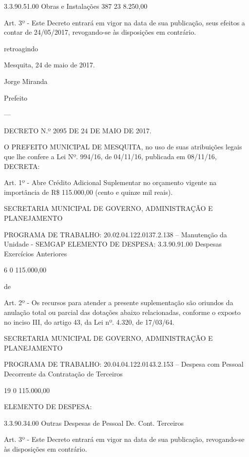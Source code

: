 \documentclass{doliberto}
\begin{document}
3.3.90.51.00  Obras e Instalações  387  23  8.250,00 

 
 

 
Art.  3º  -  Este  Decreto  entrará  em  vigor  na  data  de  sua 
publicação, 
seus  efeitos  a  contar  de 
24/05/2017, revogando-se às disposições em contrário.  
 
 

retroagindo 

Mesquita, 24 de maio de 2017.  
 
Jorge Miranda 

Prefeito 

---

DECRETO N.º 2095 DE 24 DE MAIO DE 2017. 

 
 
O  PREFEITO  MUNICIPAL  DE  MESQUITA,  no  uso  de  suas 
atribuições  legais  que  lhe  confere  a  Lei  Nº.  994/16,  de 
04/11/16, publicada em 08/11/16, DECRETA: 
 
 
Art. 1º - Abre Crédito Adicional Suplementar no orçamento 
vigente na importância de R\$ 115.000,00 (cento e quinze mil 
reais). 
 
 
SECRETARIA  MUNICIPAL  DE  GOVERNO,  ADMINISTRAÇÃO 
E PLANEJAMENTO 
 
PROGRAMA DE TRABALHO: 
20.02.04.122.0137.2.138  –  Manutenção  da  Unidade  - 
SEMGAP 
ELEMENTO DE DESPESA: 
3.3.90.91.00  Despesas 
Exercícios 
Anteriores 

6  0  115.000,00 

de 
 
Art. 2º - Os recursos para atender a presente suplementação 
são  oriundos  da  anulação  total  ou  parcial  das  dotações 
abaixo  relacionadas,  conforme  o  exposto  no  inciso  III,  do 
artigo 43, da Lei nº. 4.320, de 17/03/64. 
 
 
SECRETARIA  MUNICIPAL  DE  GOVERNO,  ADMINISTRAÇÃO 
E PLANEJAMENTO 
 
 
PROGRAMA DE TRABALHO: 
20.04.04.122.0143.2.153 – Despesa com Pessoal Decorrente 
da Contratação de Terceiros  

19  0  115.000,00 

ELEMENTO DE DESPESA: 

3.3.90.34.00  Outras Despesas de 
Pessoal  De.  Cont. 
Terceiros 

 
 
Art.  3º  -  Este  Decreto  entrará  em  vigor  na  data  de  sua 
publicação, revogando-se às disposições em contrário. 
 
\end{document}
